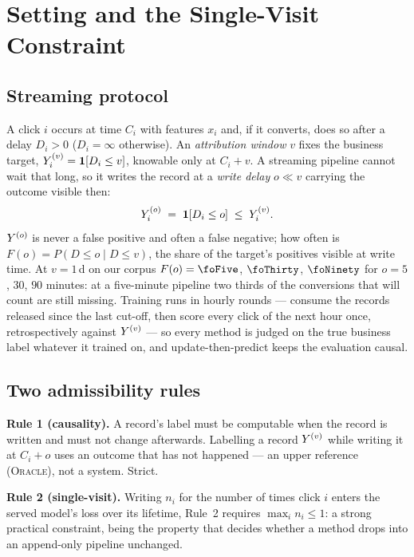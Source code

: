 \section{Setting and the Single-Visit Constraint}
\label{sec:setting}

\subsection{Streaming protocol}

A click $i$ occurs at time $C_i$ with features $x_i$ and, if it converts, does so after a delay
$D_i>0$ ($D_i=\infty$ otherwise). An \emph{attribution window} $v$ fixes the business target,
$Y^{(v)}_i=\mathbf{1}[D_i\le v]$, knowable only at $C_i+v$. A streaming pipeline cannot wait that
long, so it writes the record at a \emph{write delay} $o\ll v$ carrying the outcome visible
then:
\begin{equation}
  Y^{(o)}_i \;=\; \mathbf{1}\!\left[D_i \le o\right] \;\le\; Y^{(v)}_i .
  \label{eq:labels}
\end{equation}
$Y^{(o)}$ is never a false positive and often a false negative; how often is
$F(o)=P(D\le o\mid D\le v)$, the share of the target's positives visible at write time. At
$v=1$\,d on our corpus $F(o)=\foFive$, $\foThirty$, $\foNinety$ for $o=5$, $30$, $90$ minutes:
at a five-minute pipeline two thirds of the conversions that will count are still missing.
Training runs in hourly rounds --- consume the records released since the last cut-off, then
score every click of the next hour once, retrospectively against $Y^{(v)}$ --- so every method is
judged on the true business label whatever it trained on, and update-then-predict keeps the
evaluation causal.

\subsection{Two admissibility rules}

\textbf{Rule 1 (causality).} A record's label must be computable when the record is written
and must not change afterwards. Labelling a record $Y^{(v)}$ while writing it at $C_i+o$ uses an
outcome that has not happened --- an upper reference (\textsc{Oracle}), not a system. Strict.

\textbf{Rule 2 (single-visit).} Writing $n_i$ for the number of times click $i$ enters the
served model's loss over its lifetime, Rule~2 requires $\max_i n_i\le 1$: a strong practical
constraint, being the property that decides whether a method drops into an append-only pipeline
unchanged.


